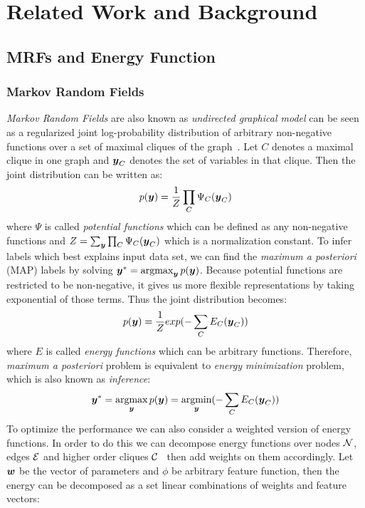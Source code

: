 
\chapter{Related Work and Background}
\label{cha:RelatedWorks}

\section{MRFs and Energy Function}
\subsection{Markov Random Fields}
\label{sec:MRF}
\emph{Markov Random Fields} are also known as \emph{undirected
  graphical model} can be seen as a regularized joint
log-probability distribution of arbitrary non-negative functions
over a set of maximal cliques of the
graph~\cite{bishop:2006:PRML}. Let $C$ denotes a maximal clique
in one graph and ${\boldsymbol{y}}_C$ denotes the set of variables in that
clique. Then the joint distribution can be written as:
\begin{align}
  p({\boldsymbol{y}})=\frac{1}{Z}\prod_{C}{\Psi_C({\boldsymbol{y}}_C)}
\end{align}
\noindent where $\Psi$ is called \emph{potential functions} which
can be defined as any non-negative functions and
$Z=\sum_{{\boldsymbol{y}}}\prod_{C}{\Psi_C({\boldsymbol{y}}_C)}$ which is a normalization
constant. To infer labels which best explains input data set, we
can find the \emph{maximum a posteriori} (MAP) labels by solving
${\boldsymbol{y}}^*=\mathop{\textrm{argmax}}_{{\boldsymbol{y}}}p({\boldsymbol{y}})$. Because potential functions are
restricted to be non-negative, it gives us more flexible
representations by taking exponential of those terms. Thus the
joint distribution becomes:
\begin{align}
  p({\boldsymbol{y}})=\frac{1}{Z}exp(-\sum_{C}{E_C({\boldsymbol{y}}_C)})
\end{align}
\noindent where $E$ is called \emph{energy functions} which can be
arbitrary functions. Therefore, \emph{maximum a posteriori}
problem is equivalent to \emph{energy minimization} problem,
which is also known as \emph{inference}:
\begin{align}
  {\boldsymbol{y}}^*=\mathop{\textrm{argmax}}_{{\boldsymbol{y}}}p({\boldsymbol{y}})=\mathop{\textrm{argmin}}_{{\boldsymbol{y}}}(-\sum_{C}{E_C({\boldsymbol{y}}_C)})
\end{align}
To optimize the performance we can also consider a weighted
version of energy functions. In order to do this we can decompose
energy functions over nodes ${\cal N}$, edges ${\cal E}$ and higher order
cliques ${\cal C}$~\cite{Szummer:ECCV08} then add weights on them
accordingly. Let ${\boldsymbol{w}}$ be the vector of parameters and $\phi$ be
arbitrary feature function, then the energy can be decomposed as
a set linear combinations of weights and feature vectors:

